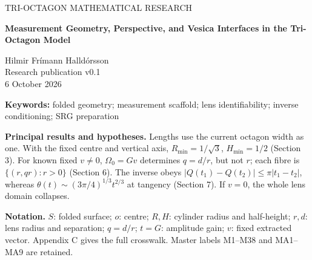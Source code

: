 \documentclass[11pt,a4paper]{article}
\begin{document}
\begin{center}
{\small\color{MidnightBlue} TRI-OCTAGON MATHEMATICAL RESEARCH}\\[7mm]
{\LARGE\bfseries Measurement Geometry, Perspective, and Vesica Interfaces in the Tri-Octagon Model\par}\vspace{5mm}
{\large Hilmir Frímann Halldórsson}\\[3mm]
Research publication v0.1\\6 October 2026
\end{center}
\begin{abstract}
We give an exact account of the measurement geometry and adopted lens-to-state interface of the Tri-Octagon model. The width-one folded module is enclosed by the minimum centered vertical cylinder of radius \(1/\sqrt3\) and half-height \(1/2\). Its highest measurement ring is distinct from the nonplanar upper rim. Explicit projections separate normal, seam and tangent directions, and distinguish a measurement polygon from a regular reference hexagon. Historical changes of units are separated from fixed-centre changes of construction. For fixed nonzero extraction data, the lens initializer retains only the ratio \(d/r\); its fibres are positive scaling rays. Ratio recovery from amplitude is sharply Lipschitz, while angle recovery at tangency is Hölder. Deterministic vector error and finite-transfer attenuation explain conditioning without restoring absent absolute scale. Conditional enclosing hosts are retained in appendices. The cylinder is a static measurement definition and the oriented lens remains a kinematic interface; neither is assigned a material or rotational law.
\end{abstract}
\noindent\textbf{Keywords:} folded geometry; measurement scaffold; lens identifiability; inverse conditioning; SRG preparation\par
\vspace{3mm}
\textbf{Principal results and hypotheses.}
Lengths use the current octagon width as one. With the fixed centre and vertical axis, \(R_{\min}=1/\sqrt3\), \(H_{\min}=1/2\) (Section 3).
For known fixed \(v\ne0\), \(\Omega_0=Gv\) determines \(q=d/r\), but not \(r\); each fibre is \(\{(r,qr):r>0\}\) (Section 6).
The inverse obeys \(|Q(t_1)-Q(t_2)|\le\pi|t_1-t_2|\), whereas \(\theta(t)\sim(3\pi/4)^{1/3}t^{2/3}\) at tangency (Section 7). If \(v=0\), the whole lens domain collapses.

\textbf{Notation.} \(S\): folded surface; \(o\): centre; \(R,H\): cylinder radius and half-height; \(r,d\): lens radius and separation; \(q=d/r\); \(t=G\): amplitude gain; \(v\): fixed extracted vector. Appendix C gives the full crosswalk. Master labels M1--M38 and MA1--MA9 are retained.
\clearpage
\begingroup\small\setcounter{tocdepth}{1}\tableofcontents\endgroup
\clearpage
\end{document}
